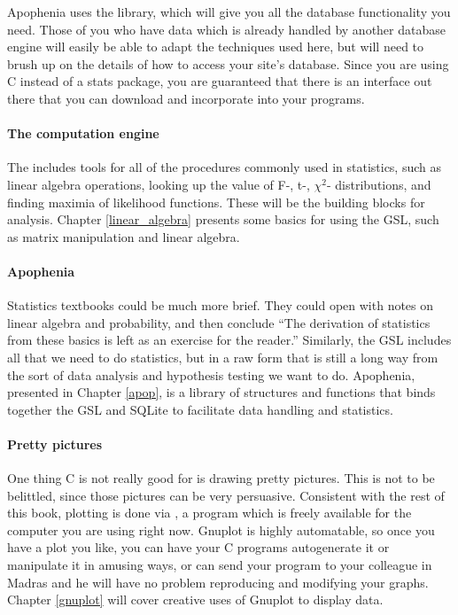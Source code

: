 \begin{multicols}{2}
Apophenia uses the  library, which will
give you all the database functionality you need. Those of you who 
have data which is already handled
by another database engine will easily be able to adapt the techniques
used here, but will need to brush up on the details of how to access
your site's database. Since you are using C instead of a stats package,
you are guaranteed that there is an interface out there that you can
download and incorporate into your programs.

\paragraph{The computation engine} The 
includes tools for all of the procedures commonly used in statistics,
such as linear algebra operations, looking up the value of F-, t-, $\chi^2$-
distributions, and finding maximia of likelihood functions. These
will be the building blocks for analysis. Chapter \ref{linear_algebra}
presents some basics for using the GSL, such as matrix manipulation and
linear algebra.

\paragraph{Apophenia}
Statistics textbooks could be much more brief. They could open
with notes on linear algebra and probability, and then conclude ``The
derivation of statistics from these basics is left as an exercise for
the reader.'' Similarly, the GSL includes all that we need to do
statistics, but in a raw form that is still a long way from the
sort of data analysis and hypothesis testing we want to do. Apophenia,
presented in Chapter \ref{apop}, is a library of structures and functions
that binds together the GSL and SQLite to facilitate data handling
and statistics.

\paragraph{Pretty pictures} One thing C is not really good for is drawing
pretty pictures. This is not to be belittled, since those pictures
can be very persuasive. Consistent with the rest of this book, plotting
is done via , a program which is freely available for
the computer you are using right now. Gnuplot is highly automatable, so once
you have a plot you like, you can have your C programs autogenerate
it or manipulate it in amusing ways, or can send your program to your
colleague in Madras and he will have no problem reproducing and modifying
your graphs. Chapter \ref{gnuplot} will cover creative uses of
Gnuplot to display data.



\end{multicols}
